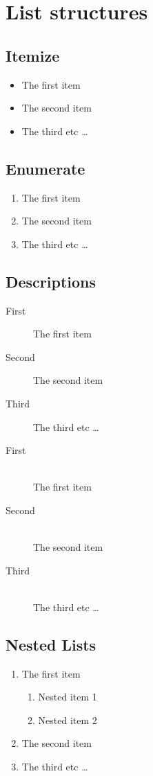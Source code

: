 \documentclass[a4paper,12pt]{article}
\begin{document}
	\section*{List structures}

	\subsection*{Itemize}
	\begin{itemize}
		\item The first item
		\item The second item
		\item The third etc \ldots
	\end{itemize}

	\subsection*{Enumerate}
	\begin{enumerate}
		\item The first item
		\item The second item
		\item The third etc \ldots
	\end{enumerate}

	\subsection*{Descriptions}
	\begin{description}
		\item[First] The first item
		\item[Second] The second item
		\item[Third] The third etc \ldots
	\end{description}

	\begin{description}
		\item[First] \hfill \\
		The first item
		\item[Second] \hfill \\
		The second item
		\item[Third] \hfill \\
		The third etc \ldots
	\end{description}

	\subsection*{Nested Lists}
	\begin{enumerate}
		\item The first item
	\begin{enumerate}
		\item Nested item 1
		\item Nested item 2
	\end{enumerate}
		\item The second item
		\item The third etc \ldots
	\end{enumerate}
\end{document}
